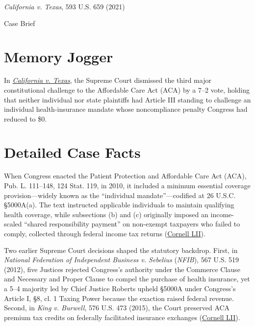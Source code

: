 \documentclass[12pt]{article}
\begin{document}
\begin{center}
{\LARGE \textit{California v. Texas}, 593 U.S. 659 (2021)\par}
\vspace{0.8em}
{\large Case Brief\par}
\end{center}
\vspace{1em}

\section{Memory Jogger}

In \href{https://www.courtlistener.com/opinion/4892571/california-v-texas/}{\textit{California v. Texas}}, the Supreme Court dismissed the third major constitutional challenge to the Affordable Care Act (ACA) by a 7--2 vote, holding that neither individual nor state plaintiffs had Article III standing to challenge an individual health-insurance mandate whose noncompliance penalty Congress had reduced to \$0.

\section{Detailed Case Facts}

When Congress enacted the Patient Protection and Affordable Care Act (ACA), Pub. L. 111--148, 124 Stat. 119, in 2010, it included a minimum essential coverage provision---widely known as the ``individual mandate''---codified at 26 U.S.C. \S 5000A(a). The text instructed applicable individuals to maintain qualifying health coverage, while subsections (b) and (c) originally imposed an income-scaled ``shared responsibility payment'' on non-exempt taxpayers who failed to comply, collected through federal income tax returns (\href{https://www.law.cornell.edu/supremecourt/text/19-840}{Cornell LII}).

Two earlier Supreme Court decisions shaped the statutory backdrop. First, in \textit{National Federation of Independent Business v. Sebelius} (\textit{NFIB}), 567 U.S. 519 (2012), five Justices rejected Congress's authority under the Commerce Clause and Necessary and Proper Clause to compel the purchase of health insurance, yet a 5--4 majority led by Chief Justice Roberts upheld \S 5000A under Congress's Article I, \S 8, cl. 1 Taxing Power because the exaction raised federal revenue. Second, in \textit{King v. Burwell}, 576 U.S. 473 (2015), the Court preserved ACA premium tax credits on federally facilitated insurance exchanges (\href{https://www.law.cornell.edu/supremecourt/text/19-840}{Cornell LII}).
\end{document}
